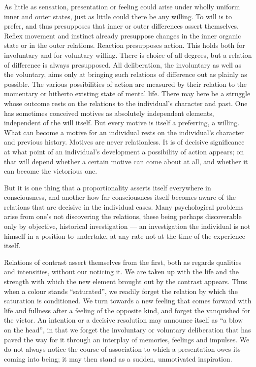 \documentclass[12pt]{article}
\newcommand{\opage}[1]{\marginnote{\footnotesize\textit{[#1]}}}
\begin{document}
As little as sensation, presentation or feeling could arise under wholly
uniform inner and outer states, just as little could there be any willing.
To will is to prefer, and thus presupposes that inner or outer differences
assert themselves. Reflex movement and instinct already presuppose changes
in the inner organic state or in the outer relations. Reaction presupposes
action. This holds both for involuntary and for voluntary willing. There is
choice of all degrees, but a relation of difference is always presupposed.
All deliberation, the involuntary as well as the voluntary, aims only at
bringing such relations of difference out as plainly as possible. The
various possibilities of action are measured by their relation to the
momentary or hitherto existing state of mental life. There may here be a
struggle whose outcome rests on the relations to the individual's character
and past. One has sometimes conceived motives as absolutely independent
elements, independent of the will itself. But every motive is itself a
preferring, a willing. What can become a motive for an individual rests on
the individual's character and previous history. Motives are never
relationless. It is of decisive significance at what point of an
individual's development a possibility of action appears; on that \opage{21}will
depend whether a certain motive can come about at all, and whether it can
become the victorious one.

\bigskip
But it is one thing that a proportionality asserts itself everywhere in
consciousness, and another how far consciousness itself becomes aware of the
relations that are decisive in the individual cases. Many psychological
problems arise from one's not discovering the relations, these being perhaps
discoverable only by objective, historical investigation --- an
investigation the individual is not himself in a position to undertake, at
any rate not at the time of the experience itself.

Relations of contrast assert themselves from the first, both as regards
qualities and intensities, without our noticing it. We are taken up with the
life and the strength with which the new element brought out by the contrast
appears. Thus when a colour stands ``saturated'', we readily forget the
relation by which the saturation is conditioned. We turn towards a new
feeling that comes forward with life and fullness after a feeling of the
opposite kind, and forget the vanquished for the victor. An intention or a
decisive resolution may announce itself as ``a blow on the head'', in that we
forget the involuntary or voluntary deliberation that has paved the way for
it through an interplay of memories, feelings and impulses. We do not always
notice the course of association to which a presentation owes its coming
into being; it may then stand as a sudden, unmotivated inspiration.
\end{document}
